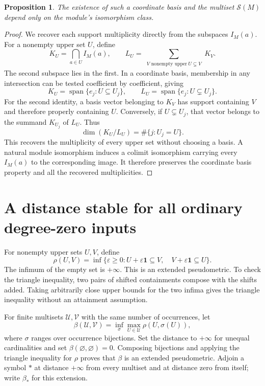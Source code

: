 \documentclass[11pt]{article}
\newtheorem{proposition}[theorem]{Proposition}
\newcommand{\one}{\mathbf 1}
\begin{document}
\begin{proposition}\label{prop:intrinsic}
The existence of such a coordinate basis and the multiset
$\mathcal S(M)$ depend only on the module's isomorphism class.
\end{proposition}
\begin{proof}
We recover each support multiplicity directly from the subspaces $I_M(a)$.
For a nonempty upper set $U$, define
\[
 K_U=\bigcap_{a\in U}I_M(a),\qquad
 L_U=\sum_{\substack{V\text{ nonempty upper}\ U\subsetneq V}}K_V.
\]
The second subspace lies in the first. In a coordinate basis, membership
in any intersection can be tested coefficient by coefficient, giving
\[
 K_U=\operatorname{span}\{e_j:U\subseteq U_j\},\qquad
 L_U=\operatorname{span}\{e_j:U\subsetneq U_j\}.
\]
For the second identity, a basis vector belonging to $K_V$ has support
containing $V$ and therefore properly containing $U$. Conversely, if
$U\subsetneq U_j$, that vector belongs to the summand $K_{U_j}$ of $L_U$.
Thus
\[
 \dim(K_U/L_U)=\#\{j:U_j=U\}.
\]
This recovers the multiplicity of every upper set without choosing a basis.
A natural module isomorphism induces a colimit isomorphism carrying every
$I_M(a)$ to the corresponding image. It therefore preserves the coordinate
basis property and all the recovered multiplicities.
\end{proof}

\section{A distance stable for all ordinary degree-zero inputs}

For nonempty upper sets $U,V$, define
\[
 \rho(U,V)=\inf\{\varepsilon\geq0:
 U+\varepsilon\one\subseteq V,\quad
 V+\varepsilon\one\subseteq U\}.
\]
The infimum of the empty set is $+\infty$. This is an extended pseudometric.
To check the triangle inequality, two pairs of shifted containments compose
with the shifts added. Taking arbitrarily close upper bounds for the two
infima gives the triangle inequality without an attainment assumption.

For finite multisets $\mathcal U,\mathcal V$ with the same number of
occurrences, let
\[
 \beta(\mathcal U,\mathcal V)
   =\inf_{\sigma}\max_{U\in\mathcal U}\rho(U,\sigma(U)),
\]
where $\sigma$ ranges over occurrence bijections. Set the distance to
$+\infty$ for unequal cardinalities and set
$\beta(\varnothing,\varnothing)=0$. Composing bijections and applying the
triangle inequality for $\rho$ proves that $\beta$ is an extended
pseudometric. Adjoin a symbol $*$ at distance $+\infty$ from every multiset
and at distance zero from itself; write $\beta_*$ for this extension.
\end{document}
